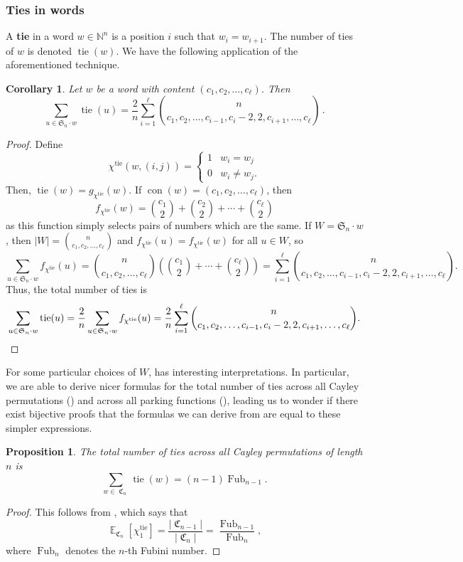 \documentclass{amsart}
\newcommand{\N}{\mathbb{N}}
\renewcommand{\S}{\mathfrak{S}}
\newcommand{\eqpd}{\, .}
\DeclareMathOperator{\tie}{tie}
\DeclareMathOperator{\Fub}{Fub}
\DeclareMathOperator{\con}{con}
\DeclareMathOperator{\E}{\mathbb{E}}
\DeclareMathOperator{\C}{\mathfrak{C}}
\newtheorem{corollary}[theorem]{Corollary}
\newtheorem{proposition}[theorem]{Proposition}
\theoremstyle{definition}
\begin{document}
\subsubsection{Ties in words} A \textbf{tie} in a word $w\in \N^n$ is a position $i$ such that $w_i=w_{i+1}$. The number of ties of $w$ is denoted $\tie(w)$. We have the following application of the aforementioned technique. 

\begin{corollary}
    \label{thm:ties-for-general-words}
    Let $w$ be a word with content $(c_1 , c_2, \dots, c_\ell)$. Then 
    \[\sum_{u\in \S_n\cdot w}\tie(u)=\frac{2}{n}\sum_{i=1}^\ell \binom{n}{c_1,c_2,\dots,c_{i-1},c_i-2,2,c_{i+1},\dots,c_\ell}\eqpd \]
\end{corollary}
\begin{proof}
Define \[\chi^{\tie}(w,(i,j))=\begin{cases}
    1&w_i=w_j\\
    0&w_i\neq w_j.
\end{cases}\]
Then, $\tie(w)=g_{\chi^{\tie}}(w)$. If $\con(w)=(c_1,c_2,\dots,c_\ell)$, then \[f_{\chi^{\tie}}(w)=\binom{c_1}{2}+\binom{c_2}{2}+\cdots+ \binom{c_\ell}{2}\] as this function simply selects pairs of numbers which are the same. If $W=\S_n \cdot w$, then $|W|=\binom{n}{c_1,c_2,\dots,c_\ell}$ and $f_{\chi^{\tie}}(u)=f_{\chi^{\tie}}(w)$ for all $u\in W$, so \[\sum_{u\in\S_n \cdot w }f_{\chi^{\tie}}(u)=\binom{n}{c_1,c_2,\dots,c_\ell}\left(\binom{c_1}{2}+\cdots +\binom{c_\ell}{2}\right)=\sum_{i=1}^\ell \binom{n}{c_1,c_2,\dots,c_{i-1},c_i-2,2,c_{i+1},\dots,c_\ell}.\]
Thus, the total number of ties is 
\[\sum_{u\in \S_n\cdot w}\tie(u)=\frac{2}{n}\sum_{u\in \S_n\cdot w}f_{\chi^{\tie}}(u)=\frac{2}{n}\sum_{i=1}^\ell \binom{n}{c_1,c_2,\dots,c_{i-1},c_i-2,2,c_{i+1},\dots,c_\ell}.\qedhere\]
\end{proof}
For some particular choices of $W$,  has interesting interpretations. In particular, we are able to derive nicer formulas for the total number of ties across all Cayley permutations () and across all parking functions (), leading us to wonder if there exist bijective proofs that the formulas we can derive from  are equal to these simpler expressions.

\begin{proposition}\label{prop:ties-in-cayley}
    The total number of ties across all Cayley permutations of length $n$ is
    \[\sum_{w\in \C_n}\tie(w)=(n-1)\Fub_{n-1}.\]
\end{proposition}
\begin{proof}
      This follows from , which says that
    \[\E_{\C_n}[\chi_1^{\tie}]=\frac{|\C_{n-1}|}{|\C_n|}=\frac{\Fub_{n-1}}{\Fub_n},\]
    where $\Fub_n$ denotes the $n$-th Fubini number. 
\end{proof}
\end{document}
